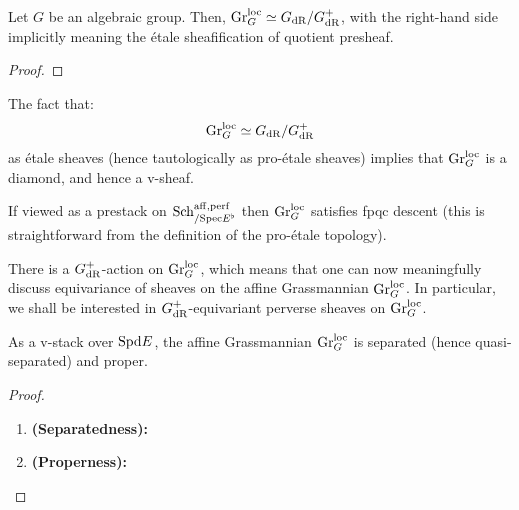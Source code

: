                 \begin{proposition} \label{prop: B_dR_affine_grassmannian_as_coset_spaces}
                    Let $G$ be an algebraic group. Then, $\mathrm{Gr}_G^{\mathrm{loc}} \simeq G_{\mathrm{dR}}/G_{\mathrm{dR}}^+$, with the right-hand side implicitly meaning the \'etale sheafification of quotient presheaf.
                \end{proposition}
                    \begin{proof}
                        
                    \end{proof}
                \begin{corollary} \label{coro: B_dR_affine_grassmannians_are_v_sheaves}
                    The fact that:
                        $$\mathrm{Gr}_G^{\mathrm{loc}} \simeq G_{\mathrm{dR}}/G_{\mathrm{dR}}^+$$
                    as \'etale sheaves (hence tautologically as pro-\'etale sheaves) implies that $\mathrm{Gr}_G^{\mathrm{loc}}$ is a diamond, and hence a v-sheaf. 
                \end{corollary}
                \begin{corollary}
                    If viewed as a prestack on $\mathrm{Sch}^{\mathrm{aff}, \mathrm{perf}}_{/\mathrm{Spec} E^{\flat}}$ then $\mathrm{Gr}_G^{\mathrm{loc}}$ satisfies fpqc descent (this is straightforward from the definition of the pro-\'etale topology).
                \end{corollary}
                \begin{corollary} \label{coro: loop_group_action_on_B_dR_grassmannians}
                    There is a $G_{\mathrm{dR}}^+$-action on $\mathrm{Gr}_G^{\mathrm{loc}}$, which means that one can now meaningfully discuss equivariance of sheaves on the affine Grassmannian $\mathrm{Gr}_G^{\mathrm{loc}}$. In particular, we shall be interested in $G_{\mathrm{dR}}^+$-equivariant perverse sheaves on $\mathrm{Gr}_G^{\mathrm{loc}}$.
                \end{corollary}
                
                \begin{proposition} \label{prop: structure_of_B_dR_affine_grassmannian}
                    As a v-stack over $\mathrm{Spd} E$, the affine Grassmannian $\mathrm{Gr}_G^{\mathrm{loc}}$ is separated (hence quasi-separated) and proper.
                \end{proposition}
                    \begin{proof}
                        \noindent
                        \begin{enumerate}
                            \item \textbf{(Separatedness):}
                            \item \textbf{(Properness):}
                        \end{enumerate}
                    \end{proof}
                
